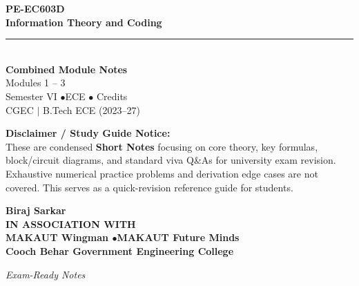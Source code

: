 \documentclass[12pt,a4paper]{article}
\begin{document}
\thispagestyle{empty}


\vspace*{1.0cm}
\begin{center}
  {\Huge\bfseries\color{myred} PE-EC603D}\\[10pt]
  {\LARGE\bfseries\color{mydark} Information Theory and Coding}\\[20pt]
  {\color{myred}\rule{0.7\linewidth}{1.5pt}}\\[18pt]
  {\Large\color{myteal}\textbf{Combined Module Notes}}\\[8pt]
  {\large\color{mydark} Modules 1 -- 3}\\[40pt]
  {\normalsize\color{mydark} Semester VI \quad$\bullet$\quad ECE \quad$\bullet$ Credits}\\[12pt]
  {\normalsize\color{mydark} CGEC \;$|$\; B.Tech ECE (2023--27)}
\end{center}
\vspace{1.0cm}
\begin{center}
  \begin{tcolorbox}[colback=mygray, colframe=mgframe, boxrule=0.5pt, arc=3pt, width=0.85\linewidth]
    \centering\small\color{mydark}
    \textbf{Disclaimer / Study Guide Notice:}\\
    These are condensed \textbf{Short Notes} focusing on core theory, key formulas, block/circuit diagrams, and standard viva Q\&As for university exam revision. Exhaustive numerical practice problems and derivation edge cases are not covered. This serves as a quick-revision reference guide for students.
  \end{tcolorbox}
\end{center}
\vfill
\vspace{0.6cm}
\begin{center}
  {\large\bfseries\color{mypurple} Biraj Sarkar}\\[16pt]
  {\footnotesize\color{watermark}\textbf{IN ASSOCIATION WITH}}\\[8pt]
  {\small\bfseries\color{mydark} MAKAUT Wingman \quad$\bullet$\quad MAKAUT Future Minds}\\[12pt]
  {\large\bfseries\color{myteal} Cooch Behar Government Engineering College}
\end{center}
\vfill
\begin{center}{\small\color{watermark}\textit{Exam-Ready Notes}}\end{center}
\clearpage
\end{document}
